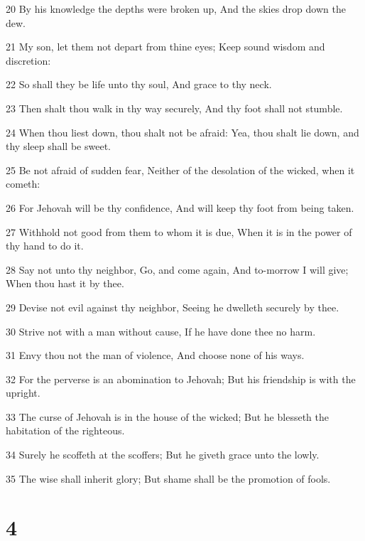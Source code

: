 \par 20 By his knowledge the depths were broken up, And the skies drop down the dew.
\par 21 My son, let them not depart from thine eyes; Keep sound wisdom and discretion:
\par 22 So shall they be life unto thy soul, And grace to thy neck.
\par 23 Then shalt thou walk in thy way securely, And thy foot shall not stumble.
\par 24 When thou liest down, thou shalt not be afraid: Yea, thou shalt lie down, and thy sleep shall be sweet.
\par 25 Be not afraid of sudden fear, Neither of the desolation of the wicked, when it cometh:
\par 26 For Jehovah will be thy confidence, And will keep thy foot from being taken.
\par 27 Withhold not good from them to whom it is due, When it is in the power of thy hand to do it.
\par 28 Say not unto thy neighbor, Go, and come again, And to-morrow I will give; When thou hast it by thee.
\par 29 Devise not evil against thy neighbor, Seeing he dwelleth securely by thee.
\par 30 Strive not with a man without cause, If he have done thee no harm.
\par 31 Envy thou not the man of violence, And choose none of his ways.
\par 32 For the perverse is an abomination to Jehovah; But his friendship is with the upright.
\par 33 The curse of Jehovah is in the house of the wicked; But he blesseth the habitation of the righteous.
\par 34 Surely he scoffeth at the scoffers; But he giveth grace unto the lowly.
\par 35 The wise shall inherit glory; But shame shall be the promotion of fools.

\chapter{4}

